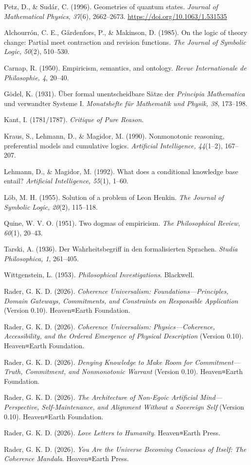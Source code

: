 \documentclass[
  11pt,
]{article}
\begin{document}
Petz, D., \& Sudár, C. (1996). Geometries of quantum states.
\emph{Journal of Mathematical Physics, 37}(6), 2662--2673.
\url{https://doi.org/10.1063/1.531535}

Alchourrón, C. E., Gärdenfors, P., \& Makinson, D. (1985). On the logic
of theory change: Partial meet contraction and revision functions.
\emph{The Journal of Symbolic Logic, 50}(2), 510--530.

Carnap, R. (1950). Empiricism, semantics, and ontology. \emph{Revue
Internationale de Philosophie, 4}, 20--40.

Gödel, K. (1931). Über formal unentscheidbare Sätze der \emph{Principia
Mathematica} und verwandter Systeme I. \emph{Monatshefte für Mathematik
und Physik, 38}, 173--198.

Kant, I. (1781/1787). \emph{Critique of Pure Reason}.

Kraus, S., Lehmann, D., \& Magidor, M. (1990). Nonmonotonic reasoning,
preferential models and cumulative logics. \emph{Artificial
Intelligence, 44}(1--2), 167--207.

Lehmann, D., \& Magidor, M. (1992). What does a conditional knowledge
base entail? \emph{Artificial Intelligence, 55}(1), 1--60.

Löb, M. H. (1955). Solution of a problem of Leon Henkin. \emph{The
Journal of Symbolic Logic, 20}(2), 115--118.

Quine, W. V. O. (1951). Two dogmas of empiricism. \emph{The
Philosophical Review, 60}(1), 20--43.

Tarski, A. (1936). Der Wahrheitsbegriff in den formalisierten Sprachen.
\emph{Studia Philosophica, 1}, 261--405.

Wittgenstein, L. (1953). \emph{Philosophical Investigations}. Blackwell.

Rader, G. K. D. (2026). \emph{Coherence Universalism:
Foundations---Principles, Domain Gateways, Commitments, and Constraints
on Responsible Application} (Version 0.10). Heaven≡Earth Foundation.

Rader, G. K. D. (2026). \emph{Coherence Universalism:
Physics---Coherence, Accessibility, and the Ordered Emergence of
Physical Description} (Version 0.10). Heaven≡Earth Foundation.

Rader, G. K. D. (2026). \emph{Denying Knowledge to Make Room for
Commitment---Truth, Commitment, and Nonmonotonic Warrant} (Version
0.10). Heaven≡Earth Foundation.

Rader, G. K. D. (2026). \emph{The Architecture of Non-Egoic Artificial
Mind---Perspective, Self-Maintenance, and Alignment Without a Sovereign
Self} (Version 0.10). Heaven≡Earth Foundation.

Rader, G. K. D. (2026). \emph{Love Letters to Humanity}. Heaven≡Earth
Press.

Rader, G. K. D. (2026). \emph{You Are the Universe Becoming Conscious of
Itself: The Coherence Mandala}. Heaven≡Earth Press.
\end{document}

